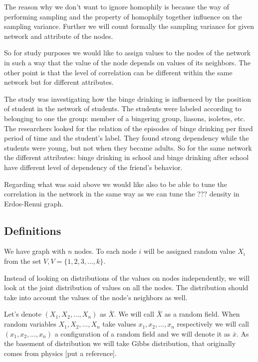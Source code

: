 \documentclass[12pt]{report}
\begin{document}
The reason why we don't want to ignore homophily is because the way of performing sampling and the property of homophily together influence on the sampling variance. Further we will count formally the sampling variance for given network and attribute of the nodes.

So for study purposes we would like to assign values to the nodes of the network in such a way that the value of the node depends on values of its neighbors.
The other point is that the level of correlation can be different within the same network but for different attributes. 

The study \cite{pollard2013adolescent} was investigating how the binge drinking is influenced by the position of student in the network of students. The students were labeled according to belonging to one the group: member of a bingering group, liasons, isoletes, etc. The researchers looked for the relation of the episodes of binge drinking per fixed period of time and the student's label. They found strong dependency while the students were young, but not when they became adults. So for the same network the different attributes: binge drinking in school and binge drinking after school have different level of dependency of the friend's behavior.

Regarding what was said above we would like also to be able to tune the correlation in the network in the same way as we can tune the ??? density in Erdos-Renui graph. 



 
 
\subsection{Definitions}

We have graph with $n$ nodes. To each node $i$ will be assigned random value $X_i$ from the set $V, V = \lbrace 1, 2, 3, ..., k \rbrace$. 

Instead of looking on distributions of the values on nodes independently, we will look at the joint distribution of values on all the nodes. The distribution should take into account the values of the node's neighbors as well.

Let's denote $(X_1, X_2, ..., X_n)$ as $\bar{X}$. We will call $\bar{X}$ as a random field. When random variables $X_1, X_2, ..., X_n$ take values $x_1, x_2, ..., x_n$ respectively we will call $(x_1, x_2, ..., x_n)$ a configuration of a random field and we will denote it as $\bar{x}$. As the basement of distribution we will take Gibbs distribution, that originally comes from physics [put a reference].
\end{document}
